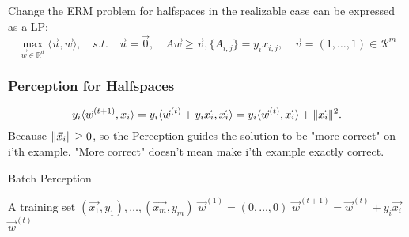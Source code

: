 Change the ERM problem for halfspaces in the realizable case can be expressed as a LP:
\begin{equation}
	\underset{\vec{w}\in\mathbb{R}^d}{\max} \langle \vec{u},\vec{w} \rangle,\quad
	s.t.\quad \vec{u} = \vec{0},\quad A \vec{w} \ge \vec{v}, \{A_{i,j}\} = y_ix_{i,j},\quad \vec{v}=(1,\dots,1)\in \mathcal{R}^m
\end{equation}

\subsubsection{Perception for Halfspaces}

\[
	y_i\langle \vec{w}^{(t+1)},x_i\rangle 
	= y_i\langle \vec{w}^{(t)}+y_i \vec{x_i}, \vec{x_i} \rangle
	= y_i\langle \vec{w}^{(t)}, \vec{x_i} \rangle + \Arrowvert \vec{x_i} \Arrowvert ^2
.\]
Because $\Arrowvert \vec{x}_i \Arrowvert \ge 0$, so the Perception guides the solution
to be "more correct" on i'th example. "More correct" doesn't mean make i'th example exactly correct.

\begin{algorithm}[h!]
	\caption{Batch Perception}
	\begin{algorithmic}
		\Require A training set $(\vec{x_1},y_1),\dots,(\vec{x_m},y_m)$
		\Ensure $\vec{w}^{(1)} = (0, \dots, 0)$
				\State $\vec{w}^{(t+1)} = \vec{w}^{(t)} + y_i \vec{x_i}$
			\Else
				\State \Return $\vec{w}^{(t)}$
			\EndIf
		\EndFor
	\end{algorithmic}
\end{algorithm}

